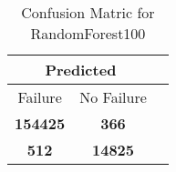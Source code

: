 \begin{table}[] 
\caption{Confusion Matric for RandomForest100} 
\label{Table: Prediction Accuracy-NoneRandomForest10099.0EKF-ignoreReflection-Reflection} 
\centering 
\begin{tabular} 
 {@{}ccc@{}} 
\toprule 
\multicolumn{2}{c}{\textbf{Predicted}}
 \\ \midrule 
\multicolumn{1}{|c|}{Failure} & 
\multicolumn{1}{c|}{No Failure}
 \\ \midrule 
\multicolumn{1}{|c|}{\color{green}\textbf{154425}} & 
\multicolumn{1}{c|}{\color{red}\textbf{366}}
 \\ \midrule 
\multicolumn{1}{|c|}{\color{red}\textbf{512}} & 
\multicolumn{1}{c|}{\color{green}\textbf{14825}}
 \\ \bottomrule 
\end{tabular} 
\end{table} 
